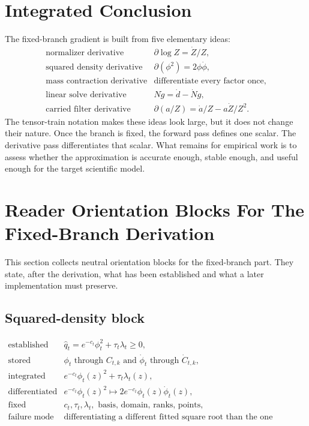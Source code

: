 \documentclass[11pt]{article}
\begin{document}
\section{Integrated Conclusion}

The fixed-branch gradient is built from five elementary ideas:
\[
\begin{array}{ll}
\text{normalizer derivative} & \partial\log Z=\dot Z/Z,\\[2mm]
\text{squared density derivative} & \partial(\phi^2)=2\phi\dot\phi,\\[2mm]
\text{mass contraction derivative} & \text{differentiate every factor once},\\[2mm]
\text{linear solve derivative} & N\dot g=\dot d-\dot N g,\\[2mm]
\text{carried filter derivative} & \partial(a/Z)=\dot a/Z-a\dot Z/Z^2.
\end{array}
\label{eq:p24-p19-110}
\]
The tensor-train notation makes these ideas look large, but it does not change
their nature.  Once the branch is fixed, the forward pass defines one scalar.
The derivative pass differentiates that scalar.  What remains for empirical
work is to assess whether the approximation is accurate enough, stable enough,
and useful enough for the target scientific model.

\section{Reader Orientation Blocks For The Fixed-Branch Derivation}

This section collects neutral orientation blocks for the fixed-branch part.
They state, after the derivation, what has
been established and what a later implementation must preserve.

\subsection*{Squared-density block}

\[
\begin{array}{ll}
\text{established} &
    \widehat q_t=e^{-c_t}\phi_t^2+\tau_t\lambda_t\ge0,\\[1mm]
\text{stored} &
    \phi_t \text{ through } C_{t,k}
    \text{ and } \dot\phi_t \text{ through } \dot C_{t,k},\\[1mm]
\text{integrated} &
    e^{-c_t}\phi_t(z)^2+\tau_t\lambda_t(z),\\[1mm]
\text{differentiated} &
    e^{-c_t}\phi_t(z)^2
    \mapsto 2e^{-c_t}\phi_t(z)\dot\phi_t(z),\\[1mm]
\text{fixed} &
    c_t,\tau_t,\lambda_t,\text{ basis, domain, ranks, points},\\[1mm]
\text{failure mode} &
    \text{differentiating a different fitted square root than the one squared.}
\end{array}
\label{eq:p24-p22-r1}
\]
\end{document}
